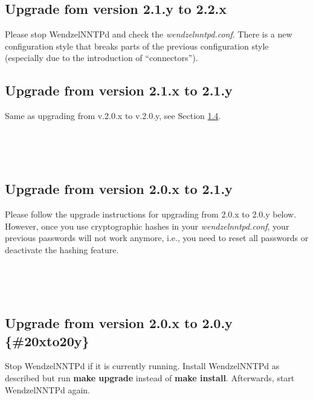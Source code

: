 \documentclass[12pt,fleqn,leqno]{scrbook}
\begin{document}
\protect\hypertarget{Ch:Upgrade}{}{}

\hypertarget{upgrade-fom-version-2.1.y-to-2.2.x-1}{%
\subsection{Upgrade fom version 2.1.y to
2.2.x}\label{upgrade-fom-version-2.1.y-to-2.2.x-1}}

Please stop WendzelNNTPd and check the \emph{wendzelnntpd.conf}. There
is a new configuration style that breaks parts of the previous
configuration style (especially due to the introduction of
``connectors'').

\hypertarget{upgrade-from-version-2.1.x-to-2.1.y-1}{%
\subsection{Upgrade from version 2.1.x to
2.1.y}\label{upgrade-from-version-2.1.x-to-2.1.y-1}}

Same as upgrading from v.2.0.x to v.2.0.y, see Section
\protect\hyperlink{20xto20y}{1.4}.

~

~

\hypertarget{upgrade-from-version-2.0.x-to-2.1.y-1}{%
\subsection{Upgrade from version 2.0.x to
2.1.y}\label{upgrade-from-version-2.0.x-to-2.1.y-1}}

Please follow the upgrade instructions for upgrading from 2.0.x to 2.0.y
below. However, once you use cryptographic hashes in your
\emph{wendzelnntpd.conf}, your previous passwords will not work anymore,
i.e., you need to reset all passwords or deactivate the hashing feature.

~

~

\hypertarget{upgrade-from-version-2.0.x-to-2.0.y-20xto20y-1}{%
\subsection{Upgrade from version 2.0.x to 2.0.y
\{\#20xto20y\}}\label{upgrade-from-version-2.0.x-to-2.0.y-20xto20y-1}}

Stop WendzelNNTPd if it is currently running. Install WendzelNNTPd as
described but run \textbf{make upgrade} instead of \textbf{make
install}. Afterwards, start WendzelNNTPd again.
\end{document}
